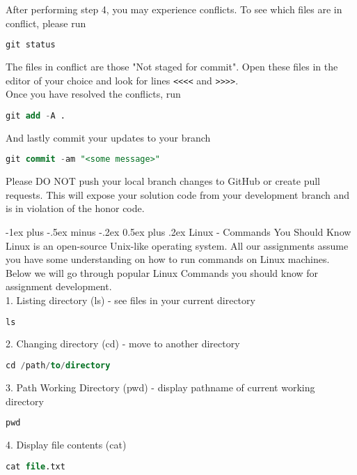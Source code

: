 \documentclass[10pt,landscape]{article}
\makeatletter
\renewcommand{\section}{\@startsection{section}{1}{0mm}%
                                {-1ex plus -.5ex minus -.2ex}%
                                {0.5ex plus .2ex}%
                                {\normalfont\large\bfseries}}
\makeatother
\begin{document}
\begin{multicols}{2}
After performing step 4, you may experience conflicts. To see which files are in conflict, please run
\begin{lstlisting}[language=SQL]
    git status
\end{lstlisting}

The files in conflict are those "Not staged for commit". Open these files in the editor of your choice and look for lines \texttt{<<<<} and \texttt{>>>>}.\\

Once you have resolved the conflicts, run
\begin{lstlisting}[language=SQL]
    git add -A .
\end{lstlisting}

And lastly commit your updates to your branch
\begin{lstlisting}[language=SQL]
    git commit -am "<some message>"
\end{lstlisting}

Please DO NOT push your local branch changes to GitHub or create pull requests. This will expose your solution code from your development branch and is in violation of the honor code. 

\section{Linux - Commands You Should Know}
Linux is an open-source Unix-like operating system. All our assignments assume you have some understanding on how to run commands on Linux machines. \\

Below we will go through popular Linux Commands you should know for assignment development.\\

1. Listing directory (ls) - see files in your current directory
\begin{lstlisting}[language=SQL]
    ls
\end{lstlisting}

2. Changing directory (cd) - move to another directory
\begin{lstlisting}[language=SQL]
    cd /path/to/directory
\end{lstlisting}

3. Path Working Directory (pwd) - display pathname of current working directory
\begin{lstlisting}[language=SQL]
    pwd
\end{lstlisting}

4. Display file contents (cat)
\begin{lstlisting}[language=SQL]
    cat file.txt
\end{lstlisting}


\end{multicols}
\end{document}
